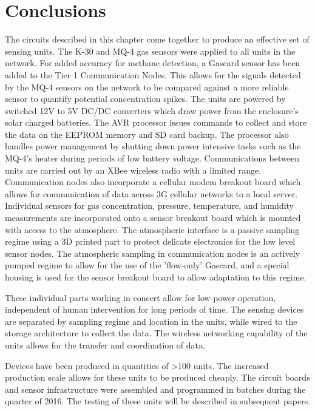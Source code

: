 \documentclass[numbook, envcountsect, envcountsame, envcountreset, runningheads, twocolumn]{svjour3}
\begin{document}
	
	\section{Conclusions}
	
		The circuits described in this chapter come together to produce an effective set of sensing units.  The K-30 and MQ-4 gas sensors were applied to all units in the network.  For added accuracy for methane detection, a Gascard sensor has been added to the Tier 1 Communication Nodes.  This allows for the signals detected by the MQ-4 sensors on the network to be compared against a more reliable sensor to quantify potential concentration spikes.  The units are powered by switched 12V to 5V DC/DC converters which draw power from the enclosure's solar charged batteries.  The AVR processor issues commands to collect and store the data on the EEPROM memory and SD card backup.  The processor also handles power management by shutting down power intensive tasks such as the MQ-4's heater during periods of low battery voltage.  Communications between units are carried out by an XBee wireless radio with a limited range.  Communication nodes also incorporate a cellular modem breakout board which allows for communication of data across 3G cellular networks to a local server.  Individual sensors for gas concentration, pressure, temperature, and humidity measurements are incorporated onto a sensor breakout board which is mounted with access to the atmosphere.  The atmospheric interface is a passive sampling regime using a 3D printed part to protect delicate electronics for the low level sensor nodes.  The atmospheric sampling in communication nodes is an actively pumped regime to allow for the use of the 'flow-only' Gascard, and a special housing is used for the sensor breakout board to allow adaptation to this regime.  
		
		These individual parts working in concert allow for low-power operation, independent of human intervention for long periods of time.  The sensing devices are separated by sampling regime and location in the units, while wired to the storage architecture to collect the data.  The wireless networking capability of the units allows for the transfer and coordination of data.
		
		Devices have been produced in quantities of \textgreater100 units.  The increased production scale allows for these units to be produced cheaply.  The circuit boards and sensor infrastructure were assembled and programmed in batches during the  quarter of 2016.  The testing of these units will be described in subsequent papers.  
	
\end{document}
